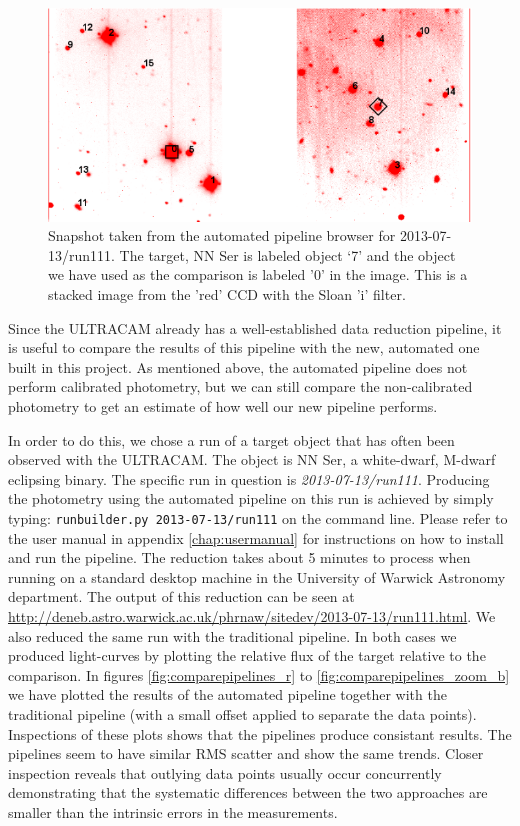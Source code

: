\begin{figure}
\centering
\includegraphics[width=120mm]{images/2013-07-13-run111-r-withlabels.png}
\caption{Snapshot taken from the automated pipeline browser for 2013-07-13/run111. The target, {NN Ser} is labeled object `7' and the object we have used as the comparison is labeled '0' in the image. This is a stacked image from the 'red' CCD with the Sloan 'i' filter. }
\label{fig:nnserfield}
\end{figure}

Since the ULTRACAM already has a well-established data reduction pipeline, it is useful to compare the results of this pipeline with the new, automated one built in this project. As mentioned above, the automated pipeline does not perform calibrated photometry, but we can still compare the non-calibrated photometry to get an estimate of how well our new pipeline performs.

In order to do this, we chose a run of a target object that has often been observed with the ULTRACAM. The object is NN Ser, a white-dwarf, M-dwarf eclipsing binary. The specific run in question is \emph{2013-07-13/run111}. Producing the photometry using the automated pipeline on this run is achieved by simply typing: \texttt{runbuilder.py 2013-07-13/run111} on the command line. Please refer to the user manual in appendix \ref{chap:usermanual} for instructions on how to install and run the pipeline.  The reduction takes about 5 minutes to process when running on a standard desktop machine in the University of Warwick Astronomy department. The output of this reduction can be seen at \url{http://deneb.astro.warwick.ac.uk/phrnaw/sitedev/2013-07-13/run111.html}. We also reduced the same run with the traditional pipeline. In both cases we produced light-curves by plotting the relative flux of the target relative to the comparison. In figures \ref{fig:comparepipelines_r} to \ref{fig:comparepipelines_zoom_b} we have plotted the results of the automated pipeline together with the traditional pipeline (with a small offset applied to separate the data points). Inspections of these plots shows that the pipelines produce consistant results. The pipelines seem to have similar RMS scatter and show the same trends. Closer inspection reveals that outlying data points usually occur concurrently demonstrating that the systematic differences between the two approaches are smaller than the intrinsic errors in the measurements. 

